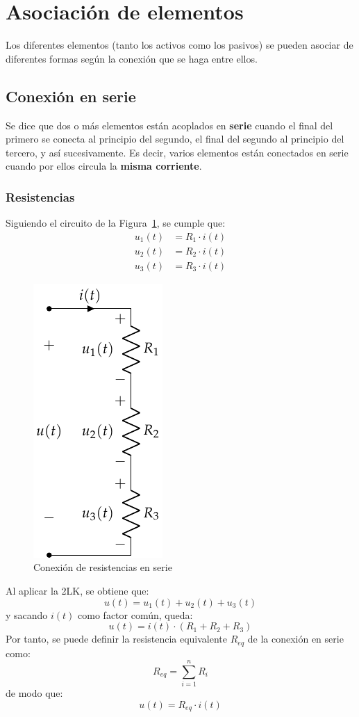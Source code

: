 	\section{Asociación de elementos}
	
	Los diferentes elementos (tanto los activos como los pasivos) se pueden asociar de diferentes formas según la conexión que se haga entre ellos. 
	
	\subsection{Conexión en serie}
	Se dice que dos o más elementos están acoplados en \textbf{serie} cuando el final del primero se conecta al principio del segundo, el final del segundo al principio del tercero, y así sucesivamente. Es decir, varios elementos están conectados en serie cuando por ellos circula la \textbf{misma corriente}. 
	
	\subsubsection{Resistencias}
	Siguiendo el circuito de la Figura~\ref{fig.serie}, se cumple que:
		\begin{align*}
			u_1(t) &= R_1 \cdot i(t)\\
			u_2(t) &= R_2 \cdot i(t)\\
			u_3(t) &= R_3 \cdot i(t)
		\end{align*}
		\begin{figure}[H]
			\centering
			\includegraphics[width=0.2\linewidth]{../figs/AsociacionSerie.pdf}
			\caption{Conexión de resistencias en serie}
			\label{fig.serie}
		\end{figure}
		Al aplicar la 2LK, se obtiene que: 
		\begin{equation*}
			u(t) = u_1(t) + u_2(t) + u_3(t)
		\end{equation*}
		y sacando $i(t)$ como factor común, queda:
		\begin{equation*}
			u(t) = i(t) \cdot (R_1 + R_2 + R_3)
		\end{equation*}
		Por tanto, se puede definir la resistencia equivalente $R_{eq}$ de la conexión en serie como:
		\begin{equation}
			\boxed{R_{eq} = \sum_{i = 1}^n R_i}
		\end{equation}
		de modo que:
		\begin{equation*}
			u(t) = R_{eq} \cdot i(t)
		\end{equation*}
		
